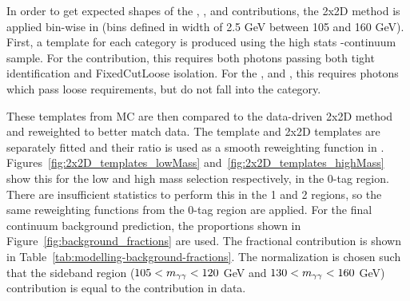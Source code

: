 In order to get expected shapes of the \yy, \yj, \jy and \jj contributions, the 2x2D method is applied bin-wise in \myy (bins defined in width of 2.5 GeV between 105 and 160 GeV). First, a template for each category is produced using the high stats \yy-continuum sample. For the \yy contribution, this requires both photons passing both tight identification and FixedCutLoose isolation. For the \yj, \jy and \jj, this requires photons which pass loose requirements, but do not fall into the \yy category.

These templates from \gls{MC} are then compared to the data-driven 2x2D method and reweighted to better match data. The template and 2x2D templates are separately fitted and their ratio is used as a smooth reweighting function in \myy. Figures~\ref{fig:2x2D_templates_lowMass} and~\ref{fig:2x2D_templates_highMass} show this for the low and high mass selection respectively, in the 0-tag region. There are insufficient statistics to perform this in the 1 and 2 \btag regions, so the same reweighting functions from the 0-tag region are applied. For the final continuum \yy background prediction, the proportions shown in Figure~\ref{fig:background_fractions} are used. The fractional contribution is shown in Table~\ref{tab:modelling-background-fractions}. The normalization is chosen such that the sideband region ($105 < m_{\gamma\gamma} < 120$ GeV and $130 < m_{\gamma\gamma} <160$ GeV) contribution is equal to the contribution in data.

